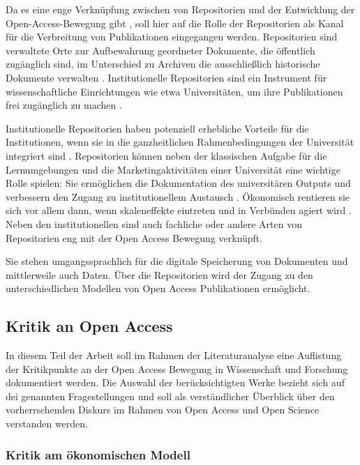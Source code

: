 Da es eine enge Verknüpfung zwischen von Repositorien und der Entwicklung der Open-Access-Bewegung gibt \cite{offhaus_2012_institutionelle_repos}, soll hier auf die Rolle der Repositorien als Kanal für die Verbreitung von Publikationen eingegangen werden. 
Repositorien sind verwaltete Orte zur Aufbewahrung geordneter Dokumente, die öffentlich zugänglich sind, im Unterschied zu Archiven die ausschließlich historische Dokumente verwalten \cite{suchen}. Institutionelle Repositorien sind ein Instrument für wissenschaftliche Einrichtungen wie etwa Universitäten, um ihre Publikationen frei zugänglich zu machen \cite{dobratz_2007_open}.

Institutionelle Repositorien haben potenziell erhebliche Vorteile für die Institutionen, wenn sie in die ganzheitlichen Rahmenbedingungen der Universität integriert sind \cite{steele_2006}. Repositorien können neben der klassischen Aufgabe für die Lernumgebungen und die Marketingaktivitäten einer Universität eine wichtige Rolle spielen: Sie ermöglichen die Dokumentation des universitären Outputs und verbessern den Zugang zu institutionellem Austausch \cite{steele_2006}. Ökonomisch rentieren sie sich vor allem dann, wenn skaleneffekte eintreten und in Verbünden agiert wird \cite{blythe_2005value}. Neben den institutionellen sind auch fachliche oder andere Arten von Repositorien eng mit der Open Access Bewegung verknüpft. 

Sie stehen umgangssprachlich für die digitale Speicherung von Dokumenten und mittlerweile auch Daten. Über die Repositorien wird der Zugang zu den unterschiedlichen Modellen von Open Access Publikationen ermöglicht.

\subsection{Kritik an Open Access}

In diesem Teil der Arbeit soll im Rahmen der Literaturanalyse eine Auflistung der Kritikpunkte an der Open Access Bewegung in Wissenschaft und Forschung dokumentiert werden. Die Auswahl der berücksichtigten Werke bezieht sich auf dei genannten Fragestellungen und soll als verständlicher Überblick über den vorherrschenden Diskurs im Rahmen von Open Access und Open Science verstanden werden.

\subsubsection{Kritik am ökonomischen Modell}

